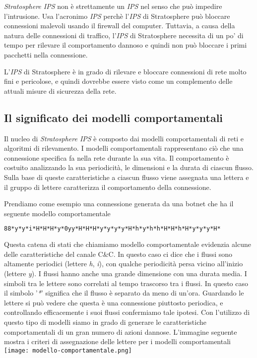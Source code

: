 \documentclass[../main.tex]{subfiles}
\begin{document}
\textit{Stratosphere IPS} non è strettamente un \textit{IPS} nel senso che può impedire l'intrusione. Usa l'acronimo \textit{IPS} perchè l'\textit{IPS} di Stratosphere può bloccare connessioni malevoli usando il firewall del computer. Tuttavia, a causa della natura delle connessioni di traffico, l'\textit{IPS} di Stratosphere necessita di un po' di tempo per rilevare il comportamento dannoso e quindi non può bloccare i primi pacchetti nella connessione.

L'\textit{IPS} di Stratosphere è in grado di rilevare e bloccare connessioni di rete molto fini e pericolose, e quindi dovrebbe essere visto come un complemento delle attuali misure di sicurezza della rete.

\subsection{Il significato dei modelli comportamentali} 
Il nucleo di \textit{Stratosphere IPS} è composto dai modelli comportamentali di reti e algoritmi di rilevamento. I modelli comportamentali rappresentano ciò che una connessione specifica fa nella rete durante la sua vita. Il comportamento è costuito analizzando la sua periodicità, le dimensioni e la durata di ciascun flusso. Sulla base di queste caratteristiche a ciascun flusso viene assegnata una lettera e il gruppo di lettere caratterizza il comportamento della connessione.

Prendiamo come esempio una connessione generata da una botnet che ha il seguente modello comportamentale
\begin{lstlisting}[language=bash]
88*y*y*i*H*H*H*y*0yy*H*H*H*y*y*y*y*H*h*y*h*h*H*H*h*H*y*y*y*H*
\end{lstlisting}

Questa catena di stati che chiamiamo modello comportamentale evidenzia alcune delle caratteristiche del canale C\&C. In questo caso ci dice che i flussi sono altamente periodici (lettere \textit{h}, \textit{i}), con qualche periodicità persa vicino all'inizio (lettere \textit{y}). I flussi hanno anche una grande dimensione con una durata media. I simboli tra le lettere sono correlati al tempo trascorso tra i flussi. In questo caso il simbolo '\textit{*}' significa che il flusso è separato da meno di un'ora. Guardando le lettere si può vedere che questa è una connessione piuttosto periodica, e controllando efficacemente i suoi flussi confermiamo tale ipotesi.
Con l'utilizzo di questo tipo di modelli siamo in grado di generare le caratteristiche comportamentali di un gran numero di azioni dannose. L'immagine seguente mostra i criteri di assegnazione delle lettere per i modelli comportamentali \newline
\texttt{[image: modello-comportamentale.png]}
\end{document}
